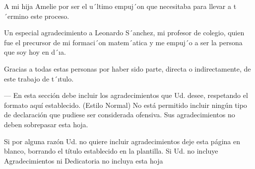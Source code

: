 A mi hija Amelie por ser el u´ltimo empuj´on que necesitaba para llevar a t´ermino este proceso.

Un especial agradecimiento a Leonardo S´anchez, mi profesor de colegio, quien fue el precursor de mi formaci´on matem´atica y me empuj´o a ser la persona que soy hoy en d´ıa.

Gracias a todas estas personas por haber sido parte, directa o indirectamente, de este trabajo de t´ıtulo.

---
En esta sección debe incluir los agradecimientos que Ud. desee, respetando el formato aquí establecido. (Estilo Normal)
No está permitido incluir ningún tipo de declaración que pudiese ser considerada ofensiva.
Sus agradecimientos no deben sobrepasar esta hoja.

Si por alguna razón Ud. no quiere incluir agradecimientos deje esta página en blanco, borrando el título establecido en la plantilla. Si Ud. no incluye Agradecimientos ni Dedicatoria no incluya esta hoja
